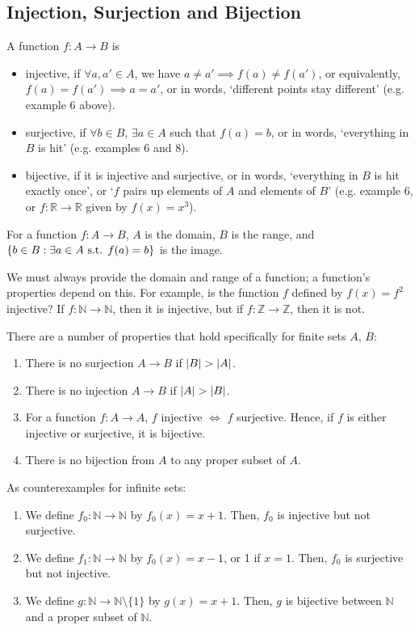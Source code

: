 \subsection{Injection, Surjection and Bijection}
\begin{definition}
	A function $f\colon A \to B$ is
	\begin{itemize}
		\item injective, if $\forall a, a' \in A$, we have $a \neq a' \implies f(a) \neq f(a')$, or equivalently, $f(a) = f(a') \implies a = a'$, or in words, `different points stay different' (e.g. example 6 above).
		\item surjective, if $\forall b \in B$, $\exists a \in A$ such that $f(a) = b$, or in words, `everything in $B$ is hit' (e.g. examples 6 and 8).
		\item bijective, if it is injective and surjective, or in words, `everything in $B$ is hit exactly once', or `$f$ pairs up elements of $A$ and elements of $B$' (e.g. example 6, or $f\colon \mathbb R \to \mathbb R$ given by $f(x) = x^3$).
	\end{itemize}
\end{definition}
\begin{definition}
	For a function $f\colon A \to B$, $A$ is the domain, $B$ is the range, and $\{ b \in B : \exists a \in A \text{ s.t. } f(a) = b \}$ is the image.
\end{definition}
We must always provide the domain and range of a function; a function's properties depend on this. For example, is the function $f$ defined by $f(x) = f^2$ injective? If $f\colon \mathbb N \to \mathbb N$, then it is injective, but if $f\colon \mathbb Z \to \mathbb Z$, then it is not.

There are a number of properties that hold specifically for finite sets $A$, $B$:
\begin{enumerate}
	\item There is no surjection $A \to B$ if $\abs{B} > \abs{A}$.
	\item There is no injection $A \to B$ if $\abs{A} > \abs{B}$.
	\item For a function $f\colon A \to A$, $f$ injective $\iff$ $f$ surjective. Hence, if $f$ is either injective or surjective, it is bijective.
	\item There is no bijection from $A$ to any proper subset of $A$.
\end{enumerate}
As counterexamples for infinite sets:
\begin{enumerate}
	\item We define $f_0\colon \mathbb N \to \mathbb N$ by $f_0(x) = x+1$. Then, $f_0$ is injective but not surjective.
	\item We define $f_1\colon \mathbb N \to \mathbb N$ by $f_0(x) = x-1$, or 1 if $x=1$. Then, $f_0$ is surjective but not injective.
	\item We define $g\colon \mathbb N \to \mathbb N \setminus \{ 1 \}$ by $g(x) = x+1$. Then, $g$ is bijective between $\mathbb N$ and a proper subset of $\mathbb N$.
\end{enumerate}

